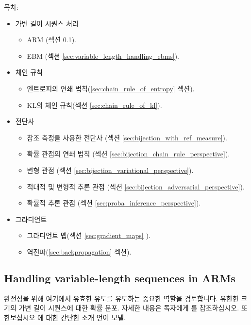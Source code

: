 \documentclass{article}
\def\eos{\texttt{EOS}\xspace}
\begin{document}
목차:
 \begin{itemize} [topsep=0pt,itemsep=3pt,parsep=3pt,leftmargin=16pt]

\item 가변 길이 시퀀스 처리 
 \begin{itemize} 
     \item ARM (섹션 \ref{sec:variable_length_handling}).
     \item EBM (섹션 \ref{sec:variable_length_handling_ebms}).
 \end{itemize} 
 \item 체인 규칙 
 \begin{itemize} 
     \item 엔트로피의 연쇄 법칙(\ref{sec:chain_rule_of_entropy} 섹션).
     \item KL의 체인 규칙(섹션 \ref{sec:chain_rule_of_kl}).
 \end{itemize} 
 \item 전단사
 \begin{itemize} 
 \item 참조 측정을 사용한 전단사 
    (섹션 \ref{sec:bijection_with_ref_measure}).
 \item 확률 관점의 연쇄 법칙 
    (섹션 \ref{sec:bijection_chain_rule_perspective}).
 \item 변형 관점 
    (섹션 \ref{sec:bijection_variational_perspective}).
 \item 적대적 및 변형적 추론 관점 
    (섹션 \ref{sec:bijection_adversarial_perspective}).
 \item 확률적 추론 관점 
    (섹션 \ref{sec:proba_inference_perspective}).
 \end{itemize} 
 \item 그라디언트 
 \begin{itemize} 
     \item 그라디언트 맵(섹션 \ref{sec:gradient_maps} ).
     \item 역전파(\ref{sec:backpropagation} 섹션).
 \end{itemize}

\end{itemize}

\subsection{Handling variable-length sequences in ARMs} 
 \label{sec:variable_length_handling}

완전성을 위해 여기에서 유효한 유도를 유도하는  중요한 역할을 검토합니다.
유한한 크기의 가변 길이 시퀀스에 대한 확률 분포.  자세한 내용은
독자에게 \citet[Section 2.5]{cotterell2023formal}를 참조하십시오.  또한보십시오
 \citet[Chapter 6]{eisenstein2019introduction}에 대한 간단한 소개
언어 모델.
\end{document}
